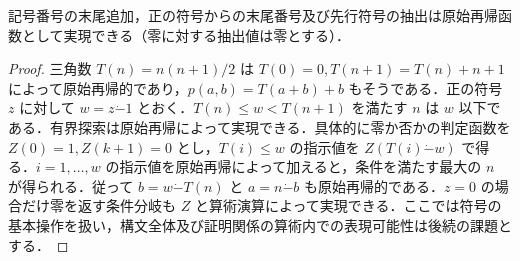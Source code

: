 \begin{prop}[語の符号の原始再帰的操作]
記号番号の末尾追加，正の符号からの末尾番号及び先行符号の抽出は原始再帰函数として実現できる（零に対する抽出値は零とする）．
\end{prop}
\begin{proof}
三角数 $T(n)=n(n+1)/2$ は $T(0)=0,T(n+1)=T(n)+n+1$ によって原始再帰的であり，$p(a,b)=T(a+b)+b$ もそうである．正の符号 $z$ に対して $w=z\mathbin{\dot-}1$ とおく．$T(n)\leq w<T(n+1)$ を満たす $n$ は $w$ 以下である．有界探索は原始再帰によって実現できる．具体的に零か否かの判定函数を $Z(0)=1,Z(k+1)=0$ とし，$T(i)\leq w$ の指示値を $Z(T(i)\mathbin{\dot-}w)$ で得る．$i=1,\ldots,w$ の指示値を原始再帰によって加えると，条件を満たす最大の $n$ が得られる．従って $b=w\mathbin{\dot-}T(n)$ と $a=n\mathbin{\dot-}b$ も原始再帰的である．$z=0$ の場合だけ零を返す条件分岐も $Z$ と算術演算によって実現できる．ここでは符号の基本操作を扱い，構文全体及び証明関係の算術内での表現可能性は後続の課題とする．
\end{proof}
